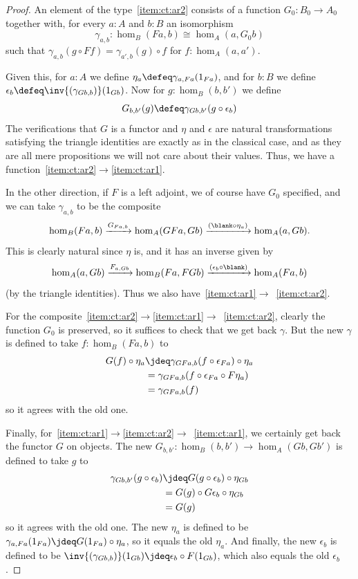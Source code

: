 \begin{proof}
  An element of the type~\ref{item:ct:ar2} consists of a function $G_0:B_0 \to A_0$ together with, for every $a:A$ and $b:B$ an isomorphism
  \[ \gamma_{a,b}:\hom_B(Fa,b) \cong \hom_A(a,G_0 b) \]
  such that $\gamma_{a,b}(g \circ Ff) = \gamma_{a',b}(g)\circ f$ for $f:\hom_{A}(a,a')$.

  Given this, for $a:A$ we define $\eta_a \defeq \gamma_{a,Fa}(1_{Fa})$, and for $b:B$ we define $\epsilon_b \defeq \inv{(\gamma_{Gb,b})}(1_{Gb})$.
  Now for $g:\hom_B(b,b')$ we define
  \[ G_{b,b'}(g) \defeq \gamma_{G b, b'}(g \circ \epsilon_b) \]
  The verifications that $G$ is a functor and $\eta$ and $\epsilon$ are natural transformations satisfying the triangle identities are exactly as in the classical case, and as they are all mere propositions we will not care about their values.
  Thus, we have a function~\ref{item:ct:ar2}$\to$\ref{item:ct:ar1}.

  In the other direction, if $F$ is a left adjoint, we of course have $G_0$ specified, and we can take $\gamma_{a,b}$ to be the composite
  \[ \hom_B(Fa,b)
  \xrightarrow{G_{Fa,b}} \hom_A(GFa,Gb)
  \xrightarrow{(\blank\circ \eta_a)} \hom_A(a,Gb).
  \]
  This is clearly natural since $\eta$ is, and it has an inverse given by
  \[ \hom_A(a,Gb)
  \xrightarrow{F_{a,Gb}} \hom_B(Fa,FGb)
  \xrightarrow{(\epsilon_b \circ \blank )} \hom_A(Fa,b)
  \]
  (by the triangle identities).
  Thus we also have~\ref{item:ct:ar1}$\to$~\ref{item:ct:ar2}.

  For the composite~\ref{item:ct:ar2}$\to$\ref{item:ct:ar1}$\to$~\ref{item:ct:ar2}, clearly the function $G_0$ is preserved, so it suffices to check that we get back $\gamma$.
  But the new $\gamma$ is defined to take $f:\hom_B(Fa,b)$ to
  \begin{align*}
    G(f) \circ \eta_a
    &\jdeq \gamma_{G Fa, b}(f \circ \epsilon_{Fa}) \circ \eta_a\\
    &= \gamma_{G Fa, b}(f \circ \epsilon_{Fa} \circ F\eta_a)\\
    &= \gamma_{G Fa, b}(f)
  \end{align*}
  so it agrees with the old one.

  Finally, for~\ref{item:ct:ar1}$\to$\ref{item:ct:ar2}$\to$~\ref{item:ct:ar1}, we certainly get back the functor $G$ on objects.
  The new $G_{b,b'}:\hom_B(b,b') \to \hom_A(Gb,Gb')$ is defined to take $g$ to
  \begin{align*}
    \gamma_{G b, b'}(g \circ \epsilon_b)
    &\jdeq G(g \circ \epsilon_b) \circ \eta_{Gb}\\
    &= G(g) \circ G\epsilon_b \circ \eta_{Gb}\\
    &= G(g)
  \end{align*}
  so it agrees with the old one.
  The new $\eta_a$ is defined to be $\gamma_{a,Fa}(1_{Fa}) \jdeq G(1_{Fa}) \circ \eta_a$, so it equals the old $\eta_a$.
  And finally, the new $\epsilon_b$ is defined to be $\inv{(\gamma_{Gb,b})}(1_{Gb}) \jdeq \epsilon_b \circ F(1_{Gb})$, which also equals the old $\epsilon_b$.
\end{proof}

